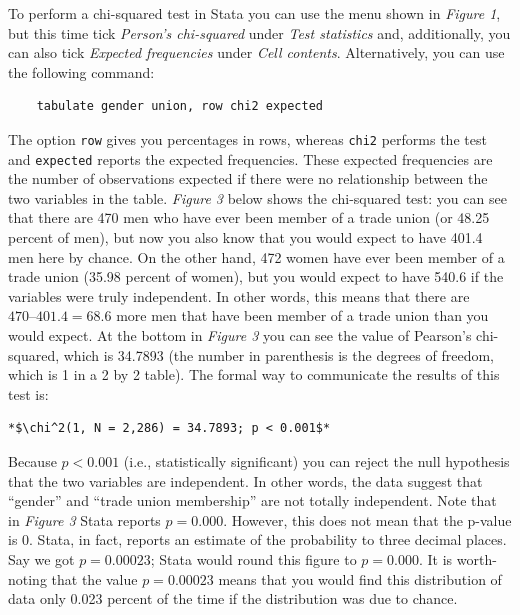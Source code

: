 \documentclass{article}
\begin{document}
To perform a chi-squared test in Stata you can use the menu shown in \textit{Figure 1}, but this time tick \textit{Person's chi-squared} under \textit{Test statistics} and, additionally, you can also tick \textit{Expected frequencies} under \textit{Cell contents}. Alternatively, you can use the following command:

\begin{lstlisting}
	tabulate gender union, row chi2 expected
\end{lstlisting}

The option \texttt{row} gives you percentages in rows, whereas \texttt{chi2} performs the test and \texttt{expected} reports the expected frequencies. These expected frequencies are the number of observations expected if there were no relationship between the two variables in the table. \textit{Figure 3} below shows the chi-squared test: you can see that there are 470 men who have ever been member of a trade union (or 48.25 percent of men), but now you also know that you would expect to have 401.4 men here by chance. On the other hand, 472 women have ever been member of a trade union (35.98 percent of women), but you would expect to have 540.6 if the variables were truly independent. In other words, this means that there are $470 – 401.4 = 68.6$ more men that have been member of a trade union than you would expect. At the bottom in \textit{Figure 3} you can see the value of Pearson's chi-squared, which is 34.7893 (the number in parenthesis is the degrees of freedom, which is 1 in a 2 by 2 table). The formal way to communicate the results of this test is:

\begin{lstlisting}[escapeinside=**]
*$\chi^2(1, N = 2,286) = 34.7893; p < 0.001$*
\end{lstlisting}

Because $p < 0.001$ (i.e., statistically significant) you can reject the null hypothesis that the two variables are independent. In other words, the data suggest that ``gender'' and ``trade union membership'' are not totally independent. Note that in \textit{Figure 3} Stata reports $p = 0.000$. However, this does not mean that the p-value is 0. Stata, in fact, reports an estimate of the probability to three decimal places. Say we got $p = 0.00023$; Stata would round this figure to $p = 0.000$. It is worth-noting that the value $p = 0.00023$ means that you would find this distribution of data only 0.023 percent of the time if the distribution was due to chance.
\end{document}
